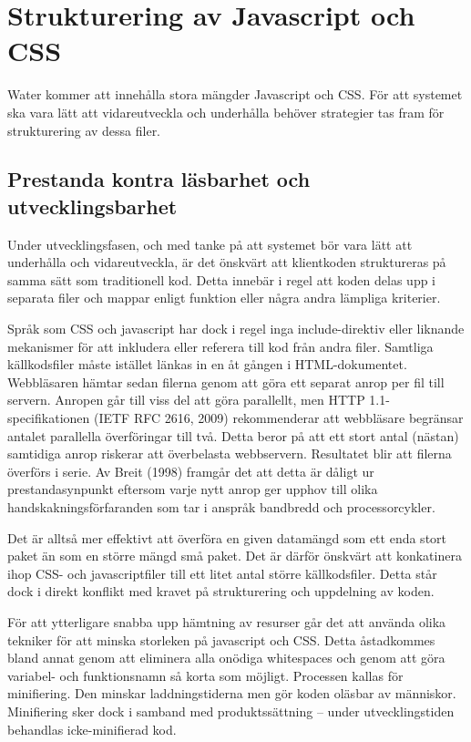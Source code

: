 \section{Strukturering av Javascript och CSS}

Water kommer att innehålla stora mängder Javascript och CSS. För att systemet ska vara lätt att vidareutveckla och underhålla behöver strategier tas fram för strukturering av dessa filer.

\subsection{Prestanda kontra läsbarhet och utvecklingsbarhet}

Under utvecklingsfasen, och med tanke på att systemet bör vara lätt att underhålla och vidareutveckla, är det önskvärt att klientkoden struktureras på samma sätt som traditionell kod. Detta innebär i regel att koden delas upp i separata filer och mappar enligt funktion eller några andra lämpliga kriterier.

Språk som CSS och javascript har dock i regel inga include-direktiv eller liknande mekanismer för att inkludera eller referera till kod från andra filer. Samtliga källkodsfiler måste istället länkas in en åt gången i HTML-dokumentet. 
Webbläsaren hämtar sedan filerna genom att göra ett separat anrop per fil till servern. Anropen går till viss del att göra parallellt, men HTTP 1.1-specifikationen (IETF RFC 2616, 2009) rekommenderar att webbläsare begränsar antalet parallella överföringar till två. Detta beror på att ett stort antal (nästan) samtidiga anrop riskerar att överbelasta webbservern. Resultatet blir att filerna överförs i serie. Av Breit (1998) framgår det att detta är dåligt ur prestandasynpunkt eftersom varje nytt anrop ger upphov till olika handskakningsförfaranden som tar i anspråk bandbredd och processorcykler. 

Det är alltså mer effektivt att överföra en given datamängd som ett enda stort paket än som en större mängd små paket. Det är därför önskvärt att konkatinera ihop CSS- och javascriptfiler till ett litet antal större källkodsfiler. Detta står dock i direkt konflikt med kravet på strukturering och uppdelning av koden.

För att ytterligare snabba upp hämtning av resurser går det att använda olika tekniker för att minska storleken på javascript och CSS. Detta åstadkommes bland annat genom att eliminera alla onödiga whitespaces och genom att göra variabel- och funktionsnamn så korta som möjligt. Processen kallas för minifiering. Den minskar laddningstiderna men gör koden oläsbar av människor. Minifiering sker dock i samband med produktssättning – under utvecklingstiden behandlas icke-minifierad kod.

